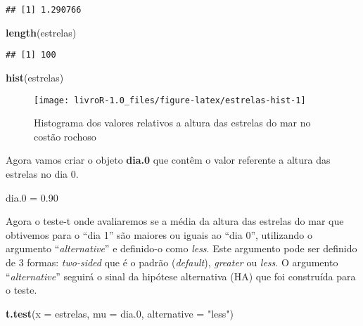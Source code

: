 \documentclass[14pt,titlepage, oneside, openany, a4paper]{book}
\newenvironment{Shaded}{\begin{snugshade}}{\end{snugshade}}
\newcommand{\DataTypeTok}[1]{\textcolor[rgb]{0.13,0.29,0.53}{#1}}
\newcommand{\FloatTok}[1]{\textcolor[rgb]{0.00,0.00,0.81}{#1}}
\newcommand{\KeywordTok}[1]{\textcolor[rgb]{0.13,0.29,0.53}{\textbf{#1}}}
\newcommand{\NormalTok}[1]{#1}
\newcommand{\StringTok}[1]{\textcolor[rgb]{0.31,0.60,0.02}{#1}}
\begin{document}
\begin{verbatim}
## [1] 1.290766
\end{verbatim}

\begin{Shaded}
\begin{Highlighting}[]
\KeywordTok{length}\NormalTok{(estrelas)}
\end{Highlighting}
\end{Shaded}

\begin{verbatim}
## [1] 100
\end{verbatim}

\begin{Shaded}
\begin{Highlighting}[]
\KeywordTok{hist}\NormalTok{(estrelas)}
\end{Highlighting}
\end{Shaded}

\begin{figure}[H]

{\centering \texttt{[image: livroR-1.0\_files/figure-latex/estrelas-hist-1]} 

}

\caption{Histograma dos valores relativos a altura das estrelas do mar no costão rochoso}\label{fig:estrelas-hist}
\end{figure}

Agora vamos criar o objeto \textbf{dia.0} que contêm o valor referente a altura das estrelas no dia 0.

\begin{Shaded}
\begin{Highlighting}[]
\NormalTok{dia}\FloatTok{.0}\NormalTok{ =}\StringTok{ }\FloatTok{0.90}
\end{Highlighting}
\end{Shaded}

Agora o teste-t onde avaliaremos se a média da altura das estrelas do mar que obtivemos para o ``dia 1'' são maiores ou iguais ao ``dia 0'', utilizando o argumento ``\emph{alternative}'' e definido-o como \emph{less}. Este argumento pode ser definido de 3 formas: \emph{two-sided} que é o padrão (\emph{default}), \emph{greater} ou \emph{less}. O argumento ``\emph{alternative}'' seguirá o sinal da hipótese alternativa (HA) que foi construída para o teste.

\begin{Shaded}
\begin{Highlighting}[]
\KeywordTok{t.test}\NormalTok{(}\DataTypeTok{x =}\NormalTok{ estrelas, }\DataTypeTok{mu =}\NormalTok{ dia}\FloatTok{.0}\NormalTok{, }\DataTypeTok{alternative =} \StringTok{"less"}\NormalTok{)}
\end{Highlighting}
\end{Shaded}
\end{document}
